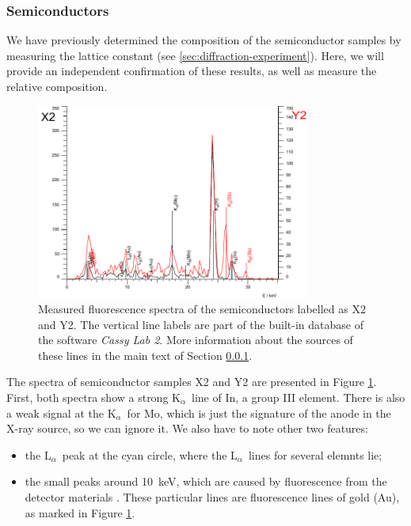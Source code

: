 \documentclass[11pt,a4paper,twoside,onecolumn]{article}
\newcommand{\Kalpha}{$\mathrm{K}_\alpha$~}
\newcommand{\Lalpha}{$\mathrm{L}_\alpha$~}
\begin{document}
\subsubsection{Semiconductors}\label{subsubsec:semiconductors}
We have previously determined the composition of the semiconductor samples by measuring the lattice constant (see \ref{sec:diffraction-experiment}). Here, we will provide an independent confirmation of these results, as well as measure the relative composition.
\begin{figure}[!htbp]
    \centering
    \includegraphics[width=0.8\textwidth]{img/spect-semiconductors.pdf}
    \caption{Measured fluorescence spectra of the semiconductors labelled as X2 and Y2. The vertical line labels are part of the built-in database of the software \emph{Cassy Lab 2}. More information about the sources of these lines in the main text of Section \ref{subsubsec:semiconductors}.}
    \label{fig:spect-semiconductors}
\end{figure}

The spectra of semiconductor samples X2 and Y2 are presented in Figure \ref{fig:spect-semiconductors}. First, both spectra show a strong \Kalpha line of In, a group III element. There is also a weak signal at the \Kalpha for Mo, which is just the signature of the anode in the X-ray source, so we can ignore it. We also have to note other two features:
\vspace*{-4pt}
\begin{itemize}[noitemsep]
    \item the \Lalpha peak at the cyan circle, where the \Lalpha lines for several elemnts lie;
    \item the small peaks around \qty{10}{keV}, which are caused by fluorescence from the detector materials \cite[Section 9]{xRayManual}. These particular lines are fluorescence lines of gold (Au), as marked in Figure \ref{fig:spect-semiconductors}.
\end{itemize}
\end{document}
